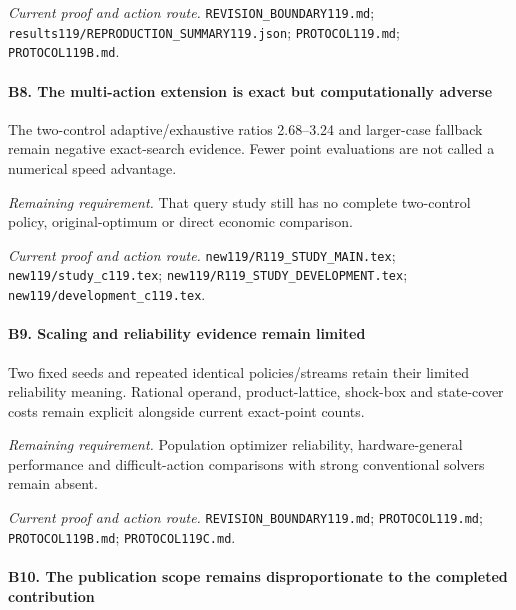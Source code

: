 \par\emph{Current proof and action route.} \nolinkurl{REVISION_BOUNDARY119.md}; \nolinkurl{results119/REPRODUCTION_SUMMARY119.json}; \nolinkurl{PROTOCOL119.md}; \nolinkurl{PROTOCOL119B.md}.

\paragraph{B8. The multi-action extension is exact but computationally adverse}

The two-control adaptive/\allowbreak{}exhaustive ratios 2.68--3.24 and larger-case fallback remain negative exact-search evidence. Fewer point evaluations are not called a numerical speed advantage.

\par\emph{Remaining requirement.} That query study still has no complete two-control policy, original-optimum or direct economic comparison.

\par\emph{Current proof and action route.} \nolinkurl{new119/R119_STUDY_MAIN.tex}; \nolinkurl{new119/study_c119.tex}; \nolinkurl{new119/R119_STUDY_DEVELOPMENT.tex}; \nolinkurl{new119/development_c119.tex}.

\paragraph{B9. Scaling and reliability evidence remain limited}

Two fixed seeds and repeated identical policies/\allowbreak{}streams retain their limited reliability meaning. Rational operand, product-lattice, shock-box and state-cover costs remain explicit alongside current exact-point counts.

\par\emph{Remaining requirement.} Population optimizer reliability, hardware-general performance and difficult-action comparisons with strong conventional solvers remain absent.

\par\emph{Current proof and action route.} \nolinkurl{REVISION_BOUNDARY119.md}; \nolinkurl{PROTOCOL119.md}; \nolinkurl{PROTOCOL119B.md}; \nolinkurl{PROTOCOL119C.md}.

\paragraph{B10. The publication scope remains disproportionate to the completed contribution}

